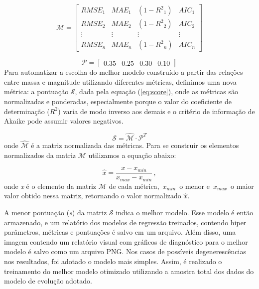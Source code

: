         
        \begin{equation}
        \label{matrix:metric}
            \mathcal{M}=\begin{bmatrix}
                {RMSE}_{1} & {MAE}_{1} & (1 - {R^2}_{1}) & {AIC}_{1} \\
                {RMSE}_{2} & {MAE}_{2} & (1 - {R^2}_{2}) & {AIC}_{2} \\
                \vdots & \vdots & \vdots & \vdots \\
                {RMSE}_{n} & {MAE}_{n} & (1 - {R^2}_{n}) & {AIC}_{n}
            \end{bmatrix}
        \end{equation}
        
        \begin{equation}
        \label{matrix:pesos}
            \mathcal{P}=\begin{bmatrix}
                0.35 & 0.25 & 0.30 & 0.10  
            \end{bmatrix}
        \end{equation}
    	 Para automatizar a escolha do melhor modelo construído a partir das relações entre massa e magnitude utilizando diferentes métricas, definimos uma nova métrica: a pontuação \(\mathcal{S}\), dada pela equação (\ref{eq:score}), onde as métricas são normalizadas e ponderadas, especialmente porque o valor do coeficiente de determinação (\(R^2\)) varia de modo inverso aos demais e o critério de informação de Akaike pode assumir valores negativos.
        
        \begin{equation}
            \label{eq:score}
            \mathcal{S} = \mathcal{\hat{M}} \cdot \mathcal{P}^T
        \end{equation}
       \noindent onde \(\mathcal{\hat{M}}\) é a matriz normalizada das métricas. Para se construir os elementos normalizados da matriz \(\mathcal{M}\) utilizamos a equação abaixo: 
        
        \begin{equation}
            \label{eq:norm}
            \hat{x} = \frac{x - x_{min}} {x_{max} - x_{min}} \, ,
        \end{equation}
    	\noindent onde \textit{x} é o elemento da matriz \(\mathcal{M}\) de cada métrica, \(\,x_{min}\,\) o menor e \(\,x_{max}\,\) o maior valor obtido nessa matriz, retornando o valor normalizado \(\hat{x}\).
        
        A menor pontuação (\textit{s}) da matriz \(\mathcal{{S}}\) indica o melhor modelo. Esse modelo é então armazenado, e um relatório dos modelos de regressão treinados, contendo hiper parâmetros, métricas e pontuações é salvo em um arquivo. Além disso, uma imagem contendo um relatório visual com gráficos de diagnóstico para o melhor modelo é salvo como um arquivo PNG. Nos casos de possíveis degenerescências nos resultados, foi adotado o modelo mais simples. Assim, é realizado o treinamento do melhor modelo otimizado utilizando a amostra total dos dados do modelo de evolução adotado.

